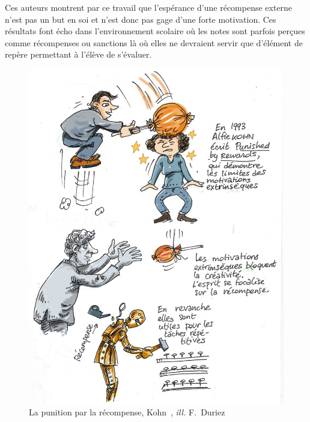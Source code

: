     Ces auteurs montrent par ce travail que l'espérance d'une récompense externe n'est pas un but en soi et n'est donc pas gage d'une forte motivation. Ces résultats font écho dans l'environnement scolaire où les notes sont parfois perçues comme récompenses ou sanctions là où elles ne devraient servir que d'élément de repère permettant à l'élève de s'évaluer.\par%
    \begin{figure}[!h]
    \begin{minipage}{0.475\linewidth}
        \centering
        \includegraphics[width=0.92\linewidth]{Figures/Duriez-motiv3.jpg}
        \caption[La punition par la récompense, Kohn~]{La punition par la récompense, Kohn~, \textit{ill.} F.~Duriez~}
        \label{fig:motiv3}
    \end{minipage}
    \hfill
    \begin{minipage}{0.475\linewidth}
        \centering

\end{minipage}
\end{figure}
